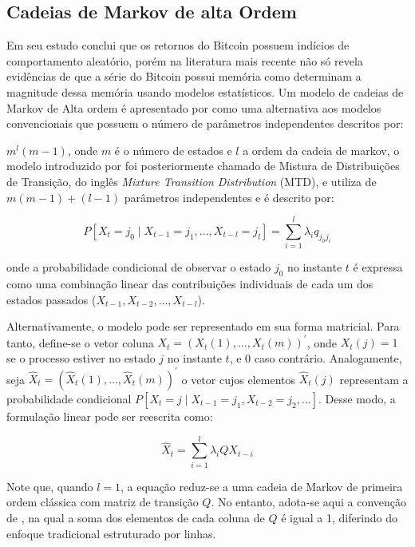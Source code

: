 \documentclass[
    12pt,                %
    openright,           %
    oneside,             %
    a4paper,             %
    english,             %
    brazil               %
]{abntex2}
\begin{document}
\subsection{Cadeias de Markov de alta Ordem}
Em seu estudo \cite{URQUHART} conclui que os retornos do Bitcoin possuem indícios de comportamento aleatório, porém na literatura mais recente \cite{NASCIMENTO} não só revela 
evidências de que a série do Bitcoin possui memória como determinam a magnitude dessa memória usando modelos estatísticos. Um modelo de cadeias de Markov de Alta ordem é 
apresentado por  como uma alternativa aos modelos convencionais que possuem o número de parâmetros independentes descritos por:

$m^l(m - 1)$, onde $m$ é o número de estados e $l$ a ordem da cadeia de markov, o modelo introduzido por  foi posteriormente chamado de Mistura de 
Distribuições de Transição, do inglês \textit{Mixture Transition Distribution} (MTD), e utiliza de $m(m -1) + (l - 1)$ parâmetros independentes e é descrito por:

\begin{equation}
    P[X_{t}=j_{0} \mid X_{t-1}=j_{1}, \dots, X_{t-l}=j_{l}] = \sum_{i=1}^{l}\lambda_{i}q_{j_{0}j_{i}}
\end{equation}

onde a probabilidade condicional de observar o estado $j_0$ no instante $t$ é expressa como uma combinação linear das contribuições individuais de cada um dos estados 
passados ($X_{t-1}, X_{t-2}, \dots, X_{t-l}$).

Alternativamente, o modelo pode ser representado em sua forma matricial. Para tanto, define-se o vetor coluna $X_t = (X_t(1), \dots, X_t(m))^\prime$, onde $X_t(j) = 1$ 
se o processo estiver no estado $j$ no instante $t$, e $0$ caso contrário. Analogamente, seja $\hat{X}_t = (\hat{X}_t(1), \dots, \hat{X}_t(m))^\prime$ o vetor cujos 
elementos $\hat{X}_t(j)$ representam a probabilidade condicional $P[X_t = j \mid X_{t-1} = j_1, X_{t-2} = j_2, \dots]$. Desse modo, a formulação linear pode ser 
reescrita como:

\begin{equation}
    \hat{X}_t = \sum_{i = 1}^{l} \lambda_i Q X_{t-i}
\end{equation}

Note que, quando $l = 1$, a equação reduz-se a uma cadeia de Markov de primeira ordem clássica com matriz de transição $Q$. No entanto, adota-se aqui a convenção de 
, na qual a soma dos elementos de cada coluna de $Q$ é igual a 1, diferindo do enfoque tradicional estruturado por linhas.
\end{document}
